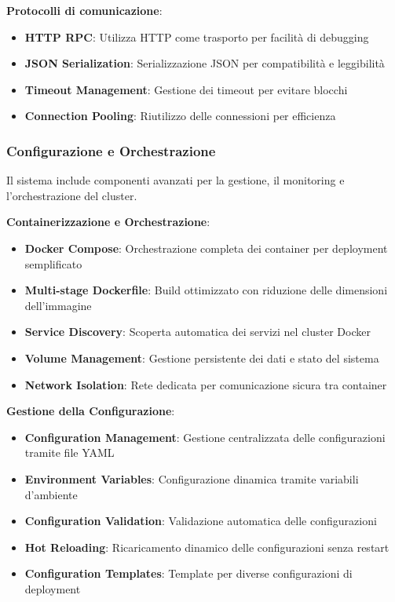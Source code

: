 \documentclass[12pt,a4paper]{article}
\begin{document}
\textbf{Protocolli di comunicazione}:
\begin{itemize}
\item \textbf{HTTP RPC}: Utilizza HTTP come trasporto per facilità di debugging
\item \textbf{JSON Serialization}: Serializzazione JSON per compatibilità e leggibilità
\item \textbf{Timeout Management}: Gestione dei timeout per evitare blocchi
\item \textbf{Connection Pooling}: Riutilizzo delle connessioni per efficienza
\end{itemize}

\subsubsection{Configurazione e Orchestrazione}

Il sistema include componenti avanzati per la gestione, il monitoring e l'orchestrazione del cluster.

\textbf{Containerizzazione e Orchestrazione}:
\begin{itemize}
\item \textbf{Docker Compose}: Orchestrazione completa dei container per deployment semplificato
\item \textbf{Multi-stage Dockerfile}: Build ottimizzato con riduzione delle dimensioni dell'immagine
\item \textbf{Service Discovery}: Scoperta automatica dei servizi nel cluster Docker
\item \textbf{Volume Management}: Gestione persistente dei dati e stato del sistema
\item \textbf{Network Isolation}: Rete dedicata per comunicazione sicura tra container
\end{itemize}

\textbf{Gestione della Configurazione}:
\begin{itemize}
\item \textbf{Configuration Management}: Gestione centralizzata delle configurazioni tramite file YAML
\item \textbf{Environment Variables}: Configurazione dinamica tramite variabili d'ambiente
\item \textbf{Configuration Validation}: Validazione automatica delle configurazioni
\item \textbf{Hot Reloading}: Ricaricamento dinamico delle configurazioni senza restart
\item \textbf{Configuration Templates}: Template per diverse configurazioni di deployment
\end{itemize}
\end{document}
